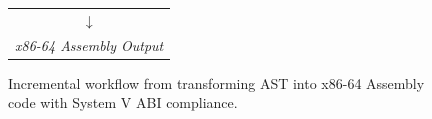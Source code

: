 \documentclass[11pt]{article}
\begin{document}
\begin{figure}[H]
\begin{tabular}{ccccc}
		\multicolumn{5}{c}{\Large $\downarrow$} \\[0.2em]

		\multicolumn{5}{c}{\scriptsize\textit{x86-64 Assembly Output}}
	\end{tabular}

	\vspace{0.8em}

	\caption{Incremental workflow from transforming AST into x86-64 Assembly code with System V ABI compliance.}
	\label{fig:process-flow}
\end{figure}

\newpage
\end{document}
